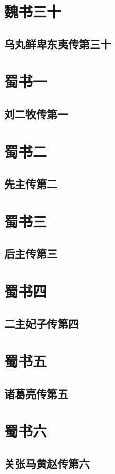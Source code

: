 \documentclass[12pt,UTF8]{ctexbook}
\begin{document}
\part{魏书三十}
\chapter{乌丸鲜卑东夷传第三十}

\part{蜀书一}
\chapter{刘二牧传第一}

\part{蜀书二}
\chapter{先主传第二}

\part{蜀书三}
\chapter{后主传第三}

\part{蜀书四}
\chapter{二主妃子传第四}

\part{蜀书五}
\chapter{诸葛亮传第五}

\part{蜀书六}
\chapter{关张马黄赵传第六}
\end{document}
